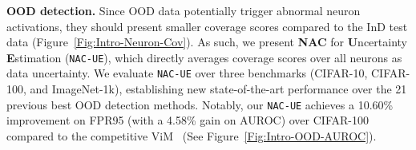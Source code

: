 \documentclass{article} \usepackage{iclr2024_conference,times}
\newcommand{\bfstart}[1]{\noindent\textbf{#1.}}
\begin{document}
\bfstart{OOD detection} 
Since OOD data potentially trigger abnormal neuron activations, they should present smaller coverage scores compared to the InD test data (Figure~\ref{Fig:Intro-Neuron-Cov}). 
As such, we present \textbf{NAC} for \textbf{U}ncertainty \textbf{E}stimation (\texttt{NAC-UE}), which directly averages coverage scores over all neurons as data uncertainty. 
We evaluate \texttt{NAC-UE} over three benchmarks (CIFAR-10, CIFAR-100, and ImageNet-1k), establishing new state-of-the-art performance over the 21 previous best OOD detection methods.
Notably, our \texttt{NAC-UE} achieves a 10.60\% improvement on FPR95 (with a 4.58\% gain on AUROC) over CIFAR-100 compared to the competitive ViM~\citep{OOD_Detect:ViM} (See Figure~\ref{Fig:Intro-OOD-AUROC}).
\end{document}
